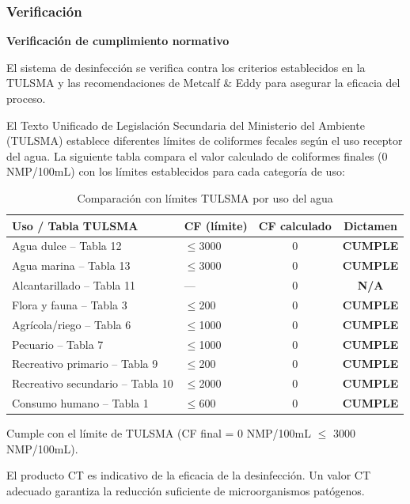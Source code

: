 \documentclass[12pt,a4paper]{article}
\begin{document}
\subsubsection{Verificación}

\textbf{Verificación de cumplimiento normativo}

El sistema de desinfección se verifica contra los criterios establecidos en la TULSMA y las recomendaciones de Metcalf \& Eddy para asegurar la eficacia del proceso.


El Texto Unificado de Legislación Secundaria del Ministerio del Ambiente (TULSMA) establece diferentes límites de coliformes fecales según el uso receptor del agua. La siguiente tabla compara el valor calculado de coliformes finales (0 NMP/100mL) con los límites establecidos para cada categoría de uso:

\begin{table}[H]
\centering
\caption{Comparación con límites TULSMA por uso del agua}
\small
\begin{tabular}{@{}llcc@{}}
\toprule
\textbf{Uso / Tabla TULSMA} & \textbf{CF (límite)} & \textbf{CF calculado} & \textbf{Dictamen} \\
\midrule
Agua dulce -- Tabla 12 & $\leq$3000 & 0 & \textbf{CUMPLE} \\
Agua marina -- Tabla 13 & $\leq$3000 & 0 & \textbf{CUMPLE} \\
Alcantarillado -- Tabla 11 & --- & 0 & \textbf{N/A} \\
Flora y fauna -- Tabla 3 & $\leq$200 & 0 & \textbf{CUMPLE} \\
Agrícola/riego -- Tabla 6 & $\leq$1000 & 0 & \textbf{CUMPLE} \\
Pecuario -- Tabla 7 & $\leq$1000 & 0 & \textbf{CUMPLE} \\
Recreativo primario -- Tabla 9 & $\leq$200 & 0 & \textbf{CUMPLE} \\
Recreativo secundario -- Tabla 10 & $\leq$2000 & 0 & \textbf{CUMPLE} \\
Consumo humano -- Tabla 1 & $\leq$600 & 0 & \textbf{CUMPLE} \\
\bottomrule
\end{tabular}
\end{table}

Cumple con el límite de TULSMA (CF final = 0 NMP/100mL $≤$ 3000 NMP/100mL).

El producto CT es indicativo de la eficacia de la desinfección. Un valor CT adecuado garantiza la reducción suficiente de microorganismos patógenos.
\end{document}
